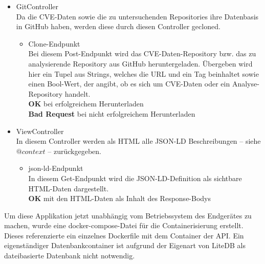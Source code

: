 \begin{itemize}
        \item GitController \label{api_controller:one} \\
            Da die \ac{CVE}-Daten sowie die zu untersuchenden Repositories ihre Datenbasis in GitHub\textsuperscript{\cite{GITHUB}} haben, werden diese durch diesen Controller gecloned.
            \begin{itemize}
                \item Clone-Endpunkt \\
                    Bei diesem Post-Endpunkt wird das CVE-Daten-Repository bzw. das zu analysierende Repository aus GitHub heruntergeladen.
                    Übergeben wird hier ein Tupel aus Strings, welches die URL und ein Tag beinhaltet sowie einen Bool-Wert, der angibt, ob es sich um CVE-Daten oder ein Analyse-Repository handelt.
                    \\
                    \textbf{OK} bei erfolgreichem Herunterladen
                    \\
                    \textbf{Bad Request} bei nicht erfolgreichem Herunterladen
            \end{itemize}

        \item ViewController \label{api_controller:four}\\
            In diesem Controller werden als HTML alle \ac{JSON-LD} Beschreibungen -- siehe $@context$ -- zurückgegeben.
            \begin{itemize}
                \item json-ld-Endpunkt \\
                    In diesem Get-Endpunkt wird die JSON-LD-Definition als sichtbare HTML-Daten dargestellt.
                    \\
                    \textbf{OK} mit den HTML-Daten als Inhalt des Response-Bodys
            \end{itemize}
    \end{itemize}

    \noindent Um diese Applikation jetzt unabhängig vom Betriebssystem des Endgerätes zu machen, wurde eine docker-compose-Datei für die Containerisierung erstellt.
    Dieses referenzierte ein einzelnes Dockerfile mit dem Container der API.
    Ein eigenständiger Datenbankcontainer ist aufgrund der Eigenart von LiteDB als dateibasierte Datenbank nicht notwendig.

